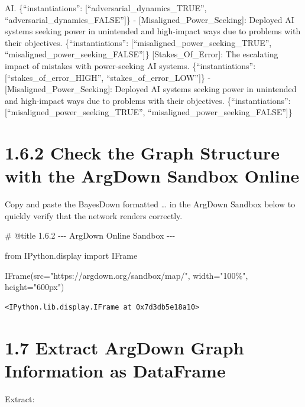 \documentclass[
  11pt,
  letterpaper,
]{book}
\newenvironment{Shaded}{\begin{snugshade}}{\end{snugshade}}
\newcommand{\CommentTok}[1]{\textcolor[rgb]{0.37,0.37,0.37}{#1}}
\newcommand{\ImportTok}[1]{\textcolor[rgb]{0.00,0.46,0.62}{#1}}
\newcommand{\NormalTok}[1]{\textcolor[rgb]{0.00,0.23,0.31}{#1}}
\newcommand{\OperatorTok}[1]{\textcolor[rgb]{0.37,0.37,0.37}{#1}}
\newcommand{\StringTok}[1]{\textcolor[rgb]{0.13,0.47,0.30}{#1}}
\begin{document}
AI. \{``instantiations'': {[}``adversarial\_dynamics\_TRUE'',
``adversarial\_dynamics\_FALSE''{]}\} -
{[}Misaligned\_Power\_Seeking{]}: Deployed AI systems seeking power in
unintended and high-impact ways due to problems with their objectives.
\{``instantiations'': {[}``misaligned\_power\_seeking\_TRUE'',
``misaligned\_power\_seeking\_FALSE''{]}\} {[}Stakes\_Of\_Error{]}: The
escalating impact of mistakes with power-seeking AI systems.
\{``instantiations'': {[}``stakes\_of\_error\_HIGH'',
``stakes\_of\_error\_LOW''{]}\} - {[}Misaligned\_Power\_Seeking{]}:
Deployed AI systems seeking power in unintended and high-impact ways due
to problems with their objectives. \{``instantiations'':
{[}``misaligned\_power\_seeking\_TRUE'',
``misaligned\_power\_seeking\_FALSE''{]}\}

\section{1.6.2 Check the Graph Structure with the ArgDown Sandbox
Online}\label{check-the-graph-structure-with-the-argdown-sandbox-online}

Copy and paste the BayesDown formatted \ldots{} in the ArgDown Sandbox
below to quickly verify that the network renders correctly.

\begin{Shaded}
\begin{Highlighting}[]
\CommentTok{\# @title 1.6.2 {-}{-}{-} ArgDown Online Sandbox {-}{-}{-}}

\ImportTok{from}\NormalTok{ IPython.display }\ImportTok{import}\NormalTok{ IFrame}

\NormalTok{IFrame(src}\OperatorTok{=}\StringTok{"https://argdown.org/sandbox/map/"}\NormalTok{, width}\OperatorTok{=}\StringTok{"100\%"}\NormalTok{, height}\OperatorTok{=}\StringTok{"600px"}\NormalTok{)}
\end{Highlighting}
\end{Shaded}

\begin{verbatim}
<IPython.lib.display.IFrame at 0x7d3db5e18a10>
\end{verbatim}

\section{1.7 Extract ArgDown Graph Information as
DataFrame}\label{extract-argdown-graph-information-as-dataframe}

Extract:
\end{document}
